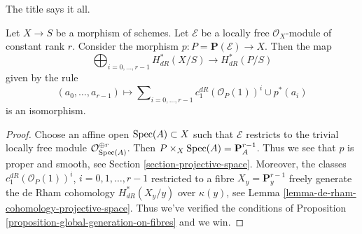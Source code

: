 \noindent
The title says it all.

\begin{proposition}
\label{proposition-projective-space-bundle-formula}
Let $X \to S$ be a morphism of schemes. Let $\mathcal{E}$ be a locally
free $\mathcal{O}_X$-module of constant rank $r$. Consider the morphism
$p : P = \mathbf{P}(\mathcal{E}) \to X$.
Then the map
$$
\bigoplus\nolimits_{i = 0, \ldots, r - 1} H^*_{dR}(X/S)
\longrightarrow
H^*_{dR}(P/S)
$$
given by the rule
$$
(a_0, \ldots, a_{r - 1}) \longmapsto
\sum\nolimits_{i = 0, \ldots, r - 1} c_1^{dR}(\mathcal{O}_P(1))^i \cup p^*(a_i)
$$
is an isomorphism.
\end{proposition}

\begin{proof}
Choose an affine open $\mathop{\mathrm{Spec}}(A) \subset X$ such that $\mathcal{E}$ restricts
to the trivial locally free module $\mathcal{O}_{\mathop{\mathrm{Spec}}(A)}^{\oplus r}$.
Then $P \times_X \mathop{\mathrm{Spec}}(A) = \mathbf{P}^{r - 1}_A$. Thus we see that
$p$ is proper and smooth, see Section \ref{section-projective-space}.
Moreover, the classes $c_1^{dR}(\mathcal{O}_P(1))^i$, $i = 0, 1, \ldots, r - 1$
restricted to a fibre $X_y = \mathbf{P}^{r - 1}_y$ freely generate the
de Rham cohomology $H^*_{dR}(X_y/y)$ over $\kappa(y)$, see
Lemma \ref{lemma-de-rham-cohomology-projective-space}. Thus we've verified the
conditions of Proposition \ref{proposition-global-generation-on-fibres}
and we win.
\end{proof}

